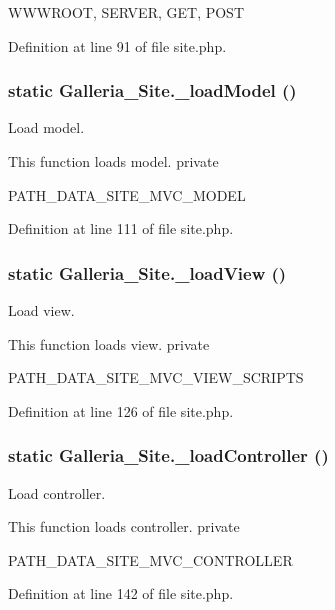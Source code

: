 WWWROOT, SERVER, GET, POST 

Definition at line 91 of file site.php.
\subsubsection{\setlength{\rightskip}{0pt plus 5cm}static Galleria\_\-Site.\_\-loadModel ()\hspace{0.3cm}{\tt  [static, protected]}}\label{classGalleria__Site_f02798a462fc9f0e66017965bdaf25a4}


Load model.

This function loads model.  private

PATH\_\-DATA\_\-SITE\_\-MVC\_\-MODEL 

Definition at line 111 of file site.php.
\subsubsection{\setlength{\rightskip}{0pt plus 5cm}static Galleria\_\-Site.\_\-loadView ()\hspace{0.3cm}{\tt  [static, protected]}}\label{classGalleria__Site_6eb1190bd3699b8f85e44d68fdcda9eb}


Load view.

This function loads view.  private

PATH\_\-DATA\_\-SITE\_\-MVC\_\-VIEW\_\-SCRIPTS 

Definition at line 126 of file site.php.
\subsubsection{\setlength{\rightskip}{0pt plus 5cm}static Galleria\_\-Site.\_\-loadController ()\hspace{0.3cm}{\tt  [static, protected]}}\label{classGalleria__Site_6bfe1443ad144256c846b760f2fb2962}


Load controller.

This function loads controller.  private

PATH\_\-DATA\_\-SITE\_\-MVC\_\-CONTROLLER 

Definition at line 142 of file site.php.
